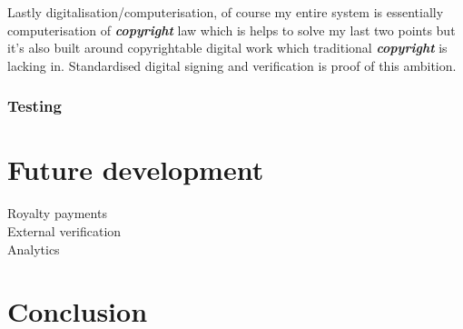 \documentclass[12pt]{article}
\newcommand{\keyword}[1]{\textbf{\textit{#1}}}
\begin{document}
Lastly digitalisation/computerisation, of course my entire system is essentially computerisation of \keyword{copyright} law which is helps to solve my last two points but it's also built around copyrightable digital work which traditional \keyword{copyright} is lacking in. Standardised digital signing and verification is proof of this ambition.


\subsubsection{Testing}

\section{Future development}

\begin{description}
	\item[Royalty payments]
	\item[External verification]
	\item[Analytics]
\end{description}

\section{Conclusion}





\end{document}
